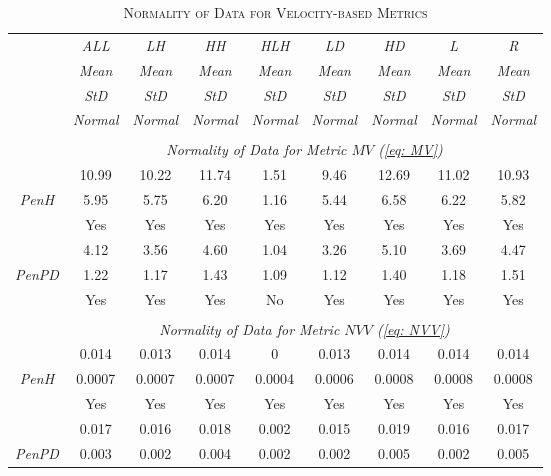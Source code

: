 \begin{table}[h]
\centering
\caption{\textsc{Normality of Data for Velocity-based Metrics}}
\begin{tabular*}{1\textwidth}{@{\extracolsep{\fill}} c | c  c  c  c  c  c  c  c}
	& {\textit{ALL}} & {\textit{LH}} & {\textit{HH}} & {\textit{HLH}} & {\textit{LD}} & {\textit{HD}} & {\textit{L}} & {\textit{R}} \\
	\cline{2-9} 
	\cline{2-9} 
	& {\textit{Mean}} & {\textit{Mean}} & {\textit{Mean}} & {\textit{Mean}} & {\textit{Mean}} & {\textit{Mean}} & {\textit{Mean}} & {\textit{Mean}} \\
	& {\textit{StD}} & {\textit{StD}} & {\textit{StD}} & {\textit{StD}} & {\textit{StD}} & {\textit{StD}} & {\textit{StD}} & {\textit{StD}} \\
	& {\textit{Normal}} & {\textit{Normal}} & {\textit{Normal}} & {\textit{Normal}} & {\textit{Normal}} & {\textit{Normal}} & {\textit{Normal}} & {\textit{Normal}} \\
	\cline{2-9}
	\\
	& \multicolumn{8}{c}{\textit{Normality of Data for Metric $MV$ (\ref{eq: MV})}} \\
	\hline 	\hline
	& 10.99 & 10.22 & 11.74 & 1.51 & 9.46 & 12.69 & 11.02 & 10.93 \\
	{\textit{PenH}} & 5.95 & 5.75 & 6.20 & 1.16 & 5.44 & 6.58 & 6.22 & 5.82 \\
	& Yes & Yes & Yes & Yes & Yes & Yes & Yes & Yes \\
	\hline
	& 4.12 & 3.56 & 4.60 & 1.04 & 3.26 & 5.10 & 3.69 & 4.47 \\
	{\textit{PenPD}} & 1.22 & 1.17 & 1.43 & 1.09 & 1.12 & 1.40 & 1.18 & 1.51 \\
	& Yes & Yes & Yes & No & Yes & Yes & Yes & Yes \\
	\\
	& \multicolumn{8}{c}{\textit{Normality of Data for Metric $NVV$ (\ref{eq: NVV})}} \\
	\hline 	\hline
	& 0.014 & 0.013 & 0.014 & 0 & 0.013 & 0.014 & 0.014 & 0.014 \\
	{\textit{PenH}} & 0.0007 & 0.0007 & 0.0007 & 0.0004 & 0.0006 & 0.0008 & 0.0008 & 0.0008 \\
	& Yes & Yes & Yes & Yes & Yes & Yes & Yes & Yes \\
	\hline
	& 0.017 & 0.016 & 0.018 & 0.002 & 0.015 & 0.019 & 0.016 & 0.017 \\
	{\textit{PenPD}} & 0.003 & 0.002 & 0.004 & 0.002 & 0.002 & 0.005 & 0.002 & 0.005 \\

\end{tabular*}
\end{table}

